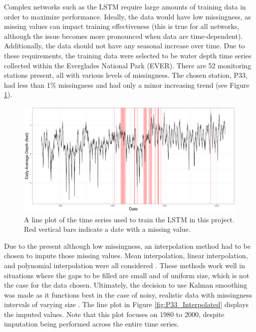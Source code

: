 Complex networks such as the LSTM require large amounts of training data in order to maximize performance. Ideally, the data would have low missingness, as missing values can impact training effectiveness (this is true for all networks, although the issue becomes more pronounced when data are time-dependent). Additionally, the data should not have any seasonal increase over time. Due to these requirements, the training data were selected to be water depth time series collected within the Everglades National Park (EVER). There are 52 monitoring stations present, all with various levels of missingness. The chosen station, P33, had less than 1\% missingness and had only a minor increasing trend (see Figure \ref{fig:P33}).

\begin{figure}[ht]
    \centering
    \includegraphics[width=0.9\linewidth]{"Figures/P33_Time_Series_Missingness.png"}
    \caption{A line plot of the time series used to train the LSTM in this project. Red vertical bars indicate a date with a missing value.}
    \label{fig:P33}
\end{figure}

Due to the present although low missingness, an interpolation method had to be chosen to impute those missing values. Mean interpolation, linear interpolation, and polynomial interpolation were all considered \citep{lepot2017interpolation}. These methods work well in situations where the gaps to be filled are small and of uniform size, which is not the case for the data chosen. Ultimately, the decision to use Kalman smoothing was made as it functions best in the case of noisy, realistic data with missingness intervals of varying size \citep{kalmanfilter}. The line plot in Figure \ref{fig:P33_Interpolated} displays the imputed values. Note that this plot focuses on 1980 to 2000, despite imputation being performed across the entire time series.

